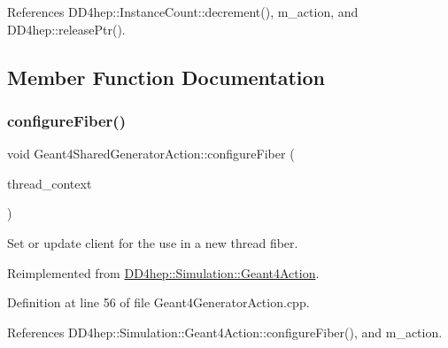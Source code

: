 References D\+D4hep\+::\+Instance\+Count\+::decrement(), m\+\_\+action, and D\+D4hep\+::release\+Ptr().



\subsection{Member Function Documentation}
\hypertarget{class_d_d4hep_1_1_simulation_1_1_geant4_shared_generator_action_a9ca0ac287c96f37ceaa07740c43e7457}{}\label{class_d_d4hep_1_1_simulation_1_1_geant4_shared_generator_action_a9ca0ac287c96f37ceaa07740c43e7457} 
\subsubsection{\texorpdfstring{configure\+Fiber()}{configureFiber()}}
{\footnotesize\ttfamily void Geant4\+Shared\+Generator\+Action\+::configure\+Fiber (\begin{DoxyParamCaption}\item[{\hyperlink{class_d_d4hep_1_1_simulation_1_1_geant4_context}{Geant4\+Context} $\ast$}]{thread\+\_\+context }\end{DoxyParamCaption})\hspace{0.3cm}{\ttfamily [virtual]}}



Set or update client for the use in a new thread fiber. 



Reimplemented from \hyperlink{class_d_d4hep_1_1_simulation_1_1_geant4_action_a6adc7138508303e4e417cb48a737ab19}{D\+D4hep\+::\+Simulation\+::\+Geant4\+Action}.



Definition at line 56 of file Geant4\+Generator\+Action.\+cpp.



References D\+D4hep\+::\+Simulation\+::\+Geant4\+Action\+::configure\+Fiber(), and m\+\_\+action.

\hypertarget{class_d_d4hep_1_1_simulation_1_1_geant4_shared_generator_action_a21ff9d287af96c7bb0a3cf8975cac070}{}\label{class_d_d4hep_1_1_simulation_1_1_geant4_shared_generator_action_a21ff9d287af96c7bb0a3cf8975cac070} 
